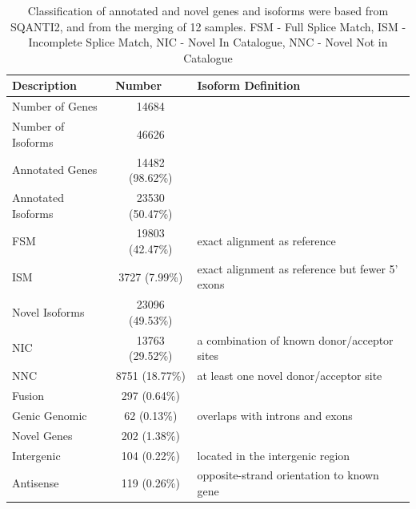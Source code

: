 \begin{table}[]
	\begin{tabularx}{1\textwidth}{lcl}
	\toprule
	Description              & \multicolumn{1}{l}{Number} & Isoform Definition               \\ \midrule
	Number of Genes    & 14684                      &                                  \\
	Number of Isoforms & 46626                      &                                  \\
	Annotated Genes          & 14482 (98.62\%)            &                                  \\
	\hspace{3mm}Annotated Isoforms       & 23530 (50.47\%)            &                                  \\
	\hspace{6mm}FSM          & 19803 (42.47\%) & exact alignment as reference  \\
	\hspace{6mm}ISM  & 3727 (7.99\%)   & exact alignment as reference but fewer 5’ exons       \\
	\hspace{3mm}Novel Isoforms           & 23096 (49.53\%)            &                                  \\
	\hspace{6mm}NIC      & 13763 (29.52\%) & a combination of known donor/acceptor sites                    \\
	\hspace{6mm}NNC   & 8751 (18.77\%)  & at least one novel donor/acceptor site    \\
	\hspace{6mm}Fusion                   & 297 (0.64\%)               &                                  \\
	\hspace{6mm}Genic Genomic            & 62 (0.13\%)                & overlaps with introns and exons  \\
	Novel Genes              & 202 (1.38\%)               &                                  \\
	\hspace{6mm}Intergenic               & 104 (0.22\%)               & located in the intergenic region \\
	\hspace{6mm}Antisense                     & 119 (0.26\%)    & opposite-strand orientation to known gene           \\ \bottomrule
	\end{tabularx}
	\caption[Gene and Isoform classification from Whole Transcriptome Iso-Seq of Tg4510]%
	{Classification of annotated and novel genes and isoforms were based from SQANTI2, and from the merging of 12 samples. FSM - Full Splice Match, ISM - Incomplete Splice Match, NIC - Novel In Catalogue, NNC - Novel Not in Catalogue }
	\label{tab:sqanti_output_whole}
\end{table}

